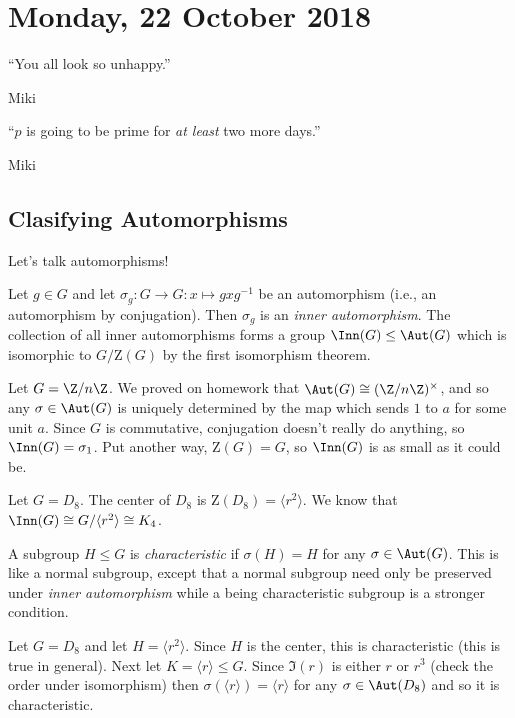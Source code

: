 \section{Monday, 22 October 2018}

\epigraph{``You all look so unhappy.''}{Miki}
\epigraph{``$p$ is going to be prime for \emph{at least} two more days.''}{Miki}

\subsection{Clasifying Automorphisms}

Let's talk automorphisms!

\begin{definition}
Let $g \in G$ and let $\sigma_g : G \to G : x \mapsto gxg^{-1}$ be an automorphism (i.e., an automorphism by conjugation). Then $\sigma_g$ is an \emph{inner automorphism}. The collection of all inner automorphisms forms a group $\Inn(G) \leq \Aut(G)$ which is isomorphic to $G/\mathrm{Z}(G)$ by the first isomorphism theorem.
\end{definition}

\begin{example}
Let $G = \Z/n\Z$. We proved on homework that $\Aut(G) \cong (\Z/n\Z)^\times$, and so any $\sigma \in \Aut(G)$ is uniquely determined by the map which sends $1$ to $a$ for some unit $a$. Since $G$ is commutative, conjugation doesn't really do anything, so $\Inn(G) = \sigma_1$. Put another way, $\mathrm{Z}(G) = G$, so $\Inn(G)$ is as small as it could be.
\end{example}

\begin{example}
Let $G = D_8$. The center of $D_8$ is $\mathrm{Z}(D_8) = \langle r^2 \rangle$. We know that $\Inn(G) \cong G/\langle r^2 \rangle \cong K_4$.
\end{example}

\begin{definition}[Characteristic]
A subgroup $H \leq G$ is \emph{characteristic} if $\sigma(H) = H$ for any $\sigma \in \Aut(G)$. This is like a normal subgroup, except that a normal subgroup need only be preserved under \emph{inner automorphism} while a being characteristic subgroup is a stronger condition.
\end{definition}

\begin{example}
Let $G = D_8$ and let $H = \langle r^2 \rangle$. Since $H$ is the center, this is characteristic (this is true in general). Next let $K = \langle r \rangle \leq G$. Since $\Im(r)$ is either $r$ or $r^3$ (check the order under isomorphism) then $\sigma(\langle r \rangle) = \langle r \rangle$ for any $\sigma \in \Aut(D_8)$ and so it is characteristic.
\end{example}

